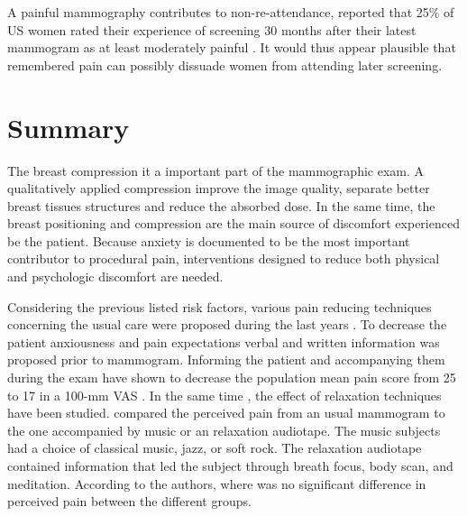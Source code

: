 A painful mammography contributes to non-re-attendance, \cite{peipins_impact_2006} reported that 25\% of US women rated their experience of screening 30
months after their latest mammogram as at least moderately painful . It would
thus appear plausible that remembered pain can possibly dissuade women from
attending later screening.

\section{Summary}\label{section:compression:conclusion}

The breast compression it a important part of the mammographic exam. A qualitatively applied compression improve the image quality, separate better breast tissues structures and reduce the absorbed dose. In the same time, the breast positioning and compression are the main source of discomfort experienced be the patient. Because anxiety is documented to be the most important contributor to procedural pain, interventions designed to reduce both physical and psychologic discomfort are needed.


Considering the previous listed risk factors, various pain reducing techniques concerning the usual care were proposed during the last years \citep{miller_interventions_2008}. To decrease the patient anxiousness and pain expectations verbal and written information was proposed prior to mammogram. Informing the patient and  accompanying them during the exam have shown to decrease the population mean pain score from 25 to 17 in a 100-mm VAS \citep{shrestha_effect_2001}. In the same time , the effect of relaxation techniques have been studied. \cite{ domar_relaxation_2005} compared the perceived pain from an usual mammogram to the one  accompanied by music or an relaxation audiotape. The music subjects had a choice of classical music, jazz, or soft rock.  The relaxation audiotape contained information that led the subject through breath focus, body scan, and meditation. According to the authors, where was no significant difference in perceived pain between the different groups. 

